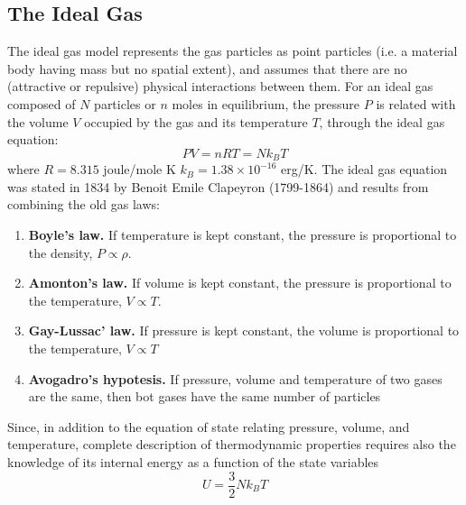 \documentclass[../../../Main.tex]{subfiles}
\begin{document}
\subsection{The Ideal Gas} 
The ideal gas model represents the gas particles as point particles (i.e. a material body having mass but no spatial extent), and assumes that there are no (attractive or repulsive) physical interactions between them. For an ideal gas composed of $N$ particles or $n$ moles in equilibrium, the pressure $P$ is related with the volume $V$ occupied by the gas and its temperature $T$, through the ideal gas equation:
\begin{equation*}
    P V = n RT = N k_B T
\end{equation*}
where $R=8.315$ joule/mole K $k_B = 1.38 \times 10^{-16}$ erg/K. The ideal gas equation was stated in 1834 by Benoit Emile Clapeyron (1799-1864) and results from combining the old gas laws: 
\begin{enumerate}
    \item \textbf{Boyle's law.} If temperature is kept constant, the pressure is proportional to the density, $P\propto \rho$. 
    \item \textbf{Amonton's law.} If volume is kept constant, the pressure is proportional to the temperature, $V\propto T$.
    \item \textbf{Gay-Lussac' law.} If pressure is kept constant, the volume is proportional to the temperature, $V\propto T$
    \item \textbf{Avogadro's hypotesis.} If pressure, volume and temperature of two gases are the same, then bot gases have the same number of particles  
\end{enumerate}
Since, in addition to the equation of state relating pressure, volume, and temperature, complete description of thermodynamic properties requires also the knowledge of its internal energy as a function of the state variables
\begin{equation*}
    U=\frac{3}{2}Nk_B T
\end{equation*}
\end{document}

